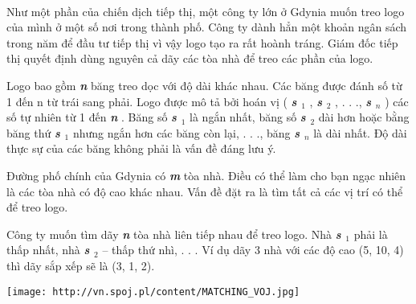  

Như một phần của chiến dịch tiếp thị, một công ty lớn ở Gdynia muốn treo logo của mình ở một số nơi trong thành phố. Công ty dành hẳn một khoản ngân sách trong năm để đầu tư tiếp thị vì vậy logo tạo ra rất hoành tráng. Giám đốc tiếp thị quyết định dùng nguyên cả dãy các tòa nhà để treo các phần của logo.

Logo bao gồm \textbf{\emph{ n }} băng treo dọc với độ dài khác nhau. Các băng được đánh số từ 1 đến n từ trái sang phải. Logo được mô tả bởi hoán vị ( \textbf{\emph{ s $_ 1 $}} , \textbf{\emph{ s $_ 2 $}} , . . ., \textbf{\emph{ s $_ n $}} ) các số tự nhiên từ 1 đến \textbf{\emph{ n }} . Băng số \textbf{\emph{ s $_ 1 $}} là ngắn nhất, băng số \textbf{\emph{ s $_ 2 $}} dài hơn hoặc bằng băng thứ \textbf{\emph{ s $_ 1 $}} nhưng ngắn hơn các băng còn lại, . . ., băng \textbf{\emph{ s $_ n $}} là dài nhất. Độ dài thực sự của các băng không phải là vấn đề đáng lưu ý.

Đường phố chính của Gdynia có \textbf{\emph{ m }} tòa nhà. Điều có thể làm cho bạn ngạc nhiên là các tòa nhà có độ cao khác nhau. Vấn đề đặt ra là tìm tất cả các vị trí có thể để treo logo.

Công ty muốn tìm dãy \textbf{\emph{ n }} tòa nhà liên tiếp nhau để treo logo. Nhà \textbf{\emph{ s $_ 1 $}} phải là thấp nhất, nhà \textbf{\emph{ s $_ 2 $}} – thấp thứ nhì, . . . Ví dụ dãy 3 nhà với các độ cao (5, 10, 4) thì dãy sắp xếp sẽ là (3, 1, 2).


\texttt{[image: http://vn.spoj.pl/content/MATCHING\_VOJ.jpg]}